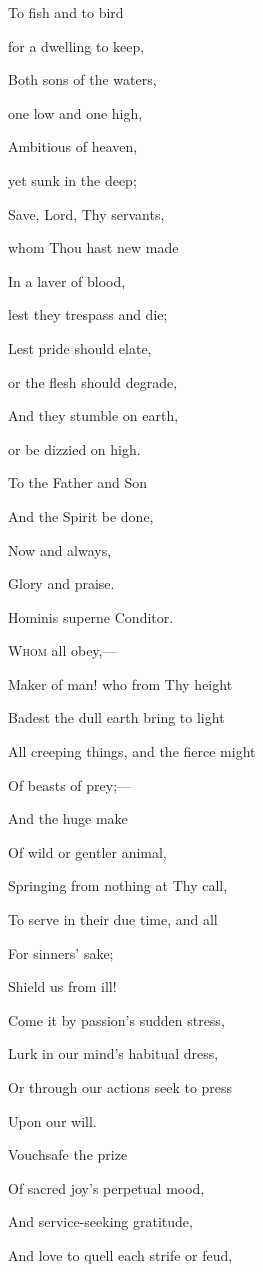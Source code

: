 To fish and to bird

for a dwelling to keep,

Both sons of the waters,

one low and one high,

Ambitious of heaven,

yet sunk in the deep;

Save, Lord, Thy servants,

whom Thou hast new made

In a laver of blood,

lest they trespass and die;

Lest pride should elate,

or the flesh should degrade,

And they stumble on earth,

or be dizzied on high. 

To the Father and Son

And the Spirit be done,

Now and always,

Glory and praise.


Hominis superne Conditor.

W\textsc{hom} all obey,—

Maker of man! who from Thy height

Badest the dull earth bring to light

All creeping things, and the fierce might

Of beasts of prey;—

And
the huge make

Of wild or gentler animal,

Springing from nothing at Thy call,

To serve in their due time, and all

For sinners' sake;

Shield us from ill!

Come it by passion's sudden stress,

Lurk in our mind's habitual dress,

Or through our actions seek to press

Upon our will. 

Vouchsafe the prize

Of sacred joy's perpetual mood,

And service-seeking gratitude,

And love to quell each strife or feud,

